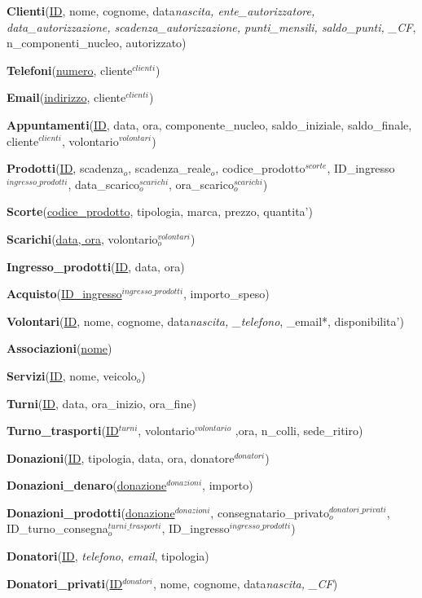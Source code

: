 \documentclass[]{article}
\begin{document}
\textbf{Clienti}(\underline{ID}, nome, cognome, data\emph{nascita,
ente\_autorizzatore, data\_autorizzazione, scadenza\_autorizzazione,
punti\_mensili, saldo\_punti, \_CF}, n\_componenti\_nucleo, autorizzato)

\textbf{Telefoni}(\underline{numero}, cliente\(^{clienti}\))

\textbf{Email}(\underline{indirizzo}, cliente\(^{clienti}\))

\textbf{Appuntamenti}(\underline{ID}, data, ora, componente\_nucleo,
saldo\_iniziale, saldo\_finale, cliente\(^{clienti}\),
volontario\(^{volontari}\))

\textbf{Prodotti}(\underline{ID}, scadenza\(_o\), scadenza\_reale\(_o\),
codice\_prodotto\(^{scorte}\), ID\_ingresso\(^{ingresso\_prodotti}\),
data\_scarico\(^{scarichi}_o\), ora\_scarico\(^{scarichi}_o\))

\textbf{Scorte}(\underline{codice\_prodotto}, tipologia, marca, prezzo,
quantita')

\textbf{Scarichi}(\underline{data, ora}, volontario\(^{volontari}_o\))

\textbf{Ingresso\_prodotti}(\underline{ID}, data, ora)

\textbf{Acquisto}(\underline{ID_ingresso$^{ingresso\_prodotti}$},
importo\_speso)

\textbf{Volontari}(\underline{ID}, nome, cognome, data\emph{nascita,
\_telefono}, \_email*, disponibilita')

\textbf{Associazioni}(\underline{nome})

\textbf{Servizi}(\underline{ID}, nome, veicolo\(_o\))

\textbf{Turni}(\underline{ID}, data, ora\_inizio, ora\_fine)

\textbf{Turno\_trasporti}(\underline{ID$^{turni}$},
volontario\(^{volontario}\) ,ora, n\_colli, sede\_ritiro)

\textbf{Donazioni}(\underline{ID}, tipologia, data, ora,
donatore\(^{donatori}\))

\textbf{Donazioni\_denaro}(\underline{donazione$^{donazioni}$}, importo)

\textbf{Donazioni\_prodotti}(\underline{donazione$^{donazioni}$},
consegnatario\_privato\(^{donatori\_privati}_o\),
ID\_turno\_consegna\(^{turni\_trasporti}_o\),
ID\_ingresso\(^{ingresso\_prodotti}\))

\textbf{Donatori}(\underline{ID}, \emph{telefono}, \emph{email},
tipologia)

\textbf{Donatori\_privati}(\underline{ID$^{donatori}$}, nome, cognome,
data\emph{nascita, \_CF})
\end{document}

